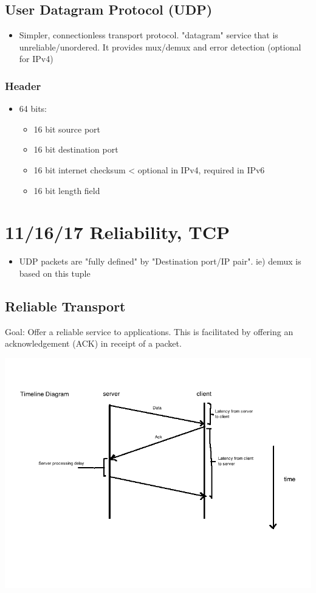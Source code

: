 \documentclass[11pt]{article}
\begin{document}
\subsection{User Datagram Protocol (UDP)}
\label{sec:orgheadline123}
\begin{itemize}
\item Simpler, connectionless transport protocol. "datagram" service that
is unreliable/unordered. It provides mux/demux and error detection
(optional for IPv4)
\end{itemize}

\subsubsection{Header}
\label{sec:orgheadline122}
\begin{itemize}
\item 64 bits:
\begin{itemize}
\item 16 bit source port
\item 16 bit destination port
\item 16 bit internet checksum < optional in IPv4, required in IPv6
\item 16 bit length field
\end{itemize}
\end{itemize}

\section{11/16/17 Reliability, TCP}
\label{sec:orgheadline128}
\begin{itemize}
\item UDP packets are "fully defined" by "Destination port/IP pair". ie)
demux is based on this tuple
\end{itemize}

\subsection{Reliable Transport}
\label{sec:orgheadline127}
Goal: Offer a reliable service to applications. This is facilitated by
offering an acknowledgement (ACK) in receipt of a packet.

\includegraphics[width=.9\linewidth]{diagrams/timeline.png}
\end{document}
